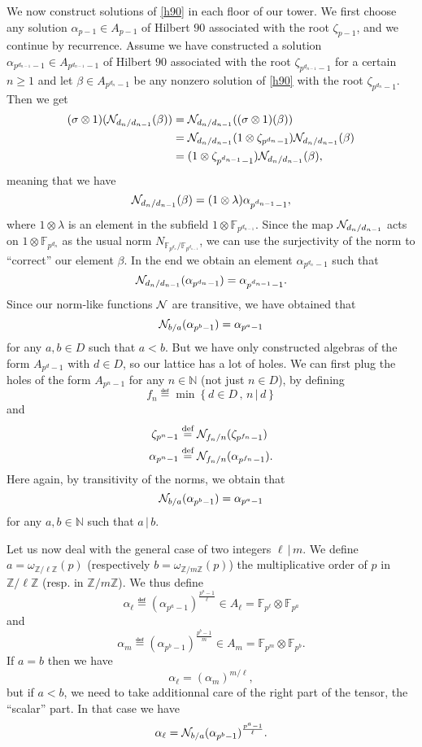 \documentclass[a4paper,11pt]{article}
\begin{document}
We now construct solutions of \eqref{h90} in each floor of our
tower. We first choose any solution $\alpha_{p-1}\in A_{p-1}$ of Hilbert $90$
associated with the root $\zeta_{p-1}$, and we continue by recurrence. Assume we
have constructed a solution $\alpha_{p^{d_{n-1}}-1}\in A_{p^{d_{n-1}}-1}$ of
Hilbert $90$ associated with the root $\zeta_{p^{d_{n-1}}-1}$ for a certain
$n\geq1$ and let
$\beta\in A_{p^{d_n}-1}$ be any nonzero solution of \eqref{h90} with the root
$\zeta_{p^{d_n}-1}$.
Then we get
\begin{align*}
  (\sigma\otimes1)(\mathcal N_{d_n/d_{n-1}}(\beta)) &= \mathcal N_{d_n/d_{n-1}}((\sigma\otimes1)(\beta)) \\
  &= \mathcal N_{d_n/d_{n-1}}(1\otimes\zeta_{p^{d_n}-1}) \mathcal N_{d_n/d_{n-1}}(\beta) \\
  &= (1\otimes\zeta_{p^{d_{n-1}}-1})\mathcal N_{d_n/d_{n-1}}(\beta),
\end{align*}
meaning that we have
\[
  \mathcal N_{d_n/d_{n-1}}(\beta)=(1\otimes\lambda)\alpha_{p^{d_{n-1}}-1},
\]
where $1\otimes\lambda$ is an element in the subfield $1\otimes\mathbb{F}_{p^{d_{n-1}}}$. Since the map
$\mathcal N_{d_n/d_{n-1}}$ acts on $1\otimes\mathbb{F}_{p^{d_n}}$ as the
usual norm $N_{\mathbb{F}_{p^{d_n}}/\mathbb{F}_{p^{d_{n-1}}}}$, we can use
the surjectivity of the norm to ``correct'' our element $\beta$. In the end we
obtain an element $\alpha_{p^{d_n}-1}$ such
that
\[
  \mathcal N_{d_n/d_{n-1}}(\alpha_{p^{d_n}-1})=
  \alpha_{p^{d_{n-1}}-1}.
\]
Since our norm-like functions $\mathcal N$ are transitive, we have obtained that 
\[
  \mathcal N_{b/a}(\alpha_{p^b-1})=\alpha_{p^a-1}
\]
for any $a,b\in D$ such that $a<b$. But we have only constructed algebras of the form
$A_{p^d-1}$ with $d\in D$, so our lattice has a lot of holes. We can first plug
the holes of the form $A_{p^{n}-1}$ for any $n\in\mathbb{N}$ (not just $n\in
D$), by defining 
\[
  f_n \eqdef \min\left\{ d\in D\,,\,n\,|\,d \right\}
\]
and
\begin{align*}
  \zeta_{p^n-1}&\overset{\text{def}}{=}  \mathcal N_{f_n/n}(\zeta_{p^{f_n}-1})\\
  \alpha_{p^n-1}&\overset{\text{def}}{=}
  \mathcal N_{f_n/n}(\alpha_{p^{f_n}-1}).
\end{align*}
Here again, by transitivity of the norms, we obtain that
\[
  \mathcal N_{b/a}(\alpha_{p^b-1})=\alpha_{p^a-1}
\]
for any $a,b\in\mathbb{N}$ such that $a\,|\,b$.



Let us now deal with the general case of two integers $\ell\,|\,m$. We define
$a=\omega_{\mathbb{Z}/\ell\mathbb{Z}}(p)$ (respectively
$b=\omega_{\mathbb{Z}/m\mathbb{Z}}(p)$) the multiplicative order of $p$ in
$\mathbb{Z}/\ell\mathbb{Z}$ (resp. in $\mathbb{Z}/m\mathbb{Z}$). We thus define
\[
  \alpha_\ell\eqdef(\alpha_{p^a-1})^{\frac{p^a-1}{\ell}}\in A_{\ell}=\mathbb{F}_{p^\ell}\otimes \mathbb{F}_{p^a}
\]
and
\[
  \alpha_m\eqdef(\alpha_{p^b-1})^{\frac{p^{b}-1}{m}}\in A_m=\mathbb{F}_{p^m}\otimes \mathbb{F}_{p^b}.
\]
If $a=b$ then we have 
\[
  \alpha_{\ell}=(\alpha_m)^{m/\ell},
\]
but if $a<b$, we need to take additionnal care of the right part of the tensor,
the ``scalar'' part. In that case we have
\[
  \alpha_\ell=\mathcal N_{b/a}(\alpha_{p^b-1})^{\frac{p^a-1}{\ell}}.
\]
\end{document}
